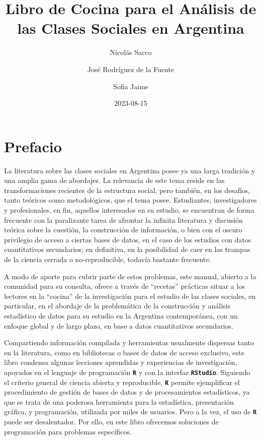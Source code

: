 \documentclass[
]{article}
\title{Libro de Cocina para el Análisis de las Clases Sociales en Argentina}
\author{Nicolás Sacco \and José Rodríguez de la Fuente \and Sofia Jaime}
\date{2023-08-15}
\begin{document}
\maketitle

{
\setcounter{tocdepth}{2}
\tableofcontents
}
\hypertarget{prefacio}{%
\section*{Prefacio}\label{prefacio}}

La literatura sobre las clases sociales en Argentina posee ya una larga tradición y una amplia gama de abordajes. La relevancia de este tema reside en las transformaciones recientes de la estructura social, pero también, en los desafíos, tanto teóricos como metodológicos, que el tema posee. Estudiantes, investigadores y profesionales, en fin, aquellos interesados en su estudio, se encuentran de forma frecuente con la paralizante tarea de afrontar la infinita literatura y discusión teórica sobre la cuestión, la construcción de información, o bien con el oscuro privilegio de acceso a ciertas bases de datos, en el caso de los estudios con datos cuantitativos secundarios; en definitiva, en la posibilidad de caer en las trampas de la ciencia cerrada o no-reproducible, todavía bastante frecuente.

A modo de aporte para cubrir parte de estos problemas, este manual, abierto a la comunidad para su consulta, ofrece a través de ``recetas'' prácticas situar a los lectores en la ``cocina'' de la investigación para el estudio de las clases sociales, en particular, en el abordaje de la problemática de la construcción y análisis estadístico de datos para su estudio en la Argentina contemporánea, con un enfoque global y de largo plazo, en base a datos cuantitativos secundarios.

Compartiendo información compilada y herramientas usualmente dispersas tanto en la literatura, como en bibliotecas o bases de datos de acceso exclusivo, este libro condensa algunas lecciones aprendidas y experiencias de investigación, apoyados en el lenguaje de programación \textbf{\texttt{R}} y con la interfaz \textbf{\texttt{RStudio}}. Siguiendo el criterio general de ciencia abierta y reproducible, \textbf{\texttt{R}} permite ejemplificar el procedimiento de gestión de bases de datos y de procesamientos estadísticos, ya que se trata de una poderosa herramienta para la estadística, presentación gráfica, y programación, utilizada por miles de usuarios. Pero a la vez, el uso de \textbf{\texttt{R}} puede ser desalentador. Por ello, en este libro ofrecemos soluciones de programación para problemas específicos.
\end{document}
